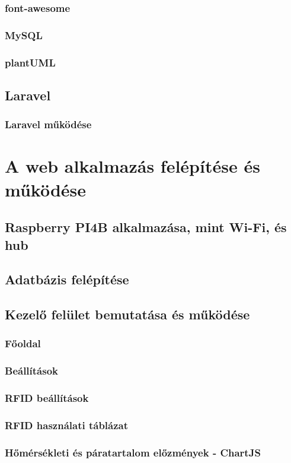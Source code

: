 \documentclass[
]{thesis-ekf}
\theoremstyle{definition}
\theoremstyle{remark}
\begin{document}
	\subsection{font-awesome}
	\subsection{MySQL}
	\subsection{plantUML}
	\section{Laravel}
	\subsection{Laravel működése}
	
	\chapter{A web alkalmazás felépítése és működése}
	\section{Raspberry PI4B alkalmazása, mint Wi-Fi, és hub}
	\section{Adatbázis felépítése}
	\section{Kezelő felület bemutatása és működése}
	\subsection{Főoldal}
	\subsection{Beállítások}
	\subsection{RFID beállítások}
	\subsection{RFID használati táblázat}
	\subsection{Hőmérsékleti és páratartalom előzmények - ChartJS}
\end{document}
